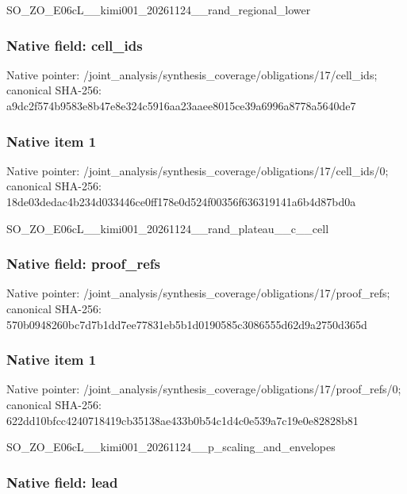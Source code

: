 \documentclass[10pt,a4paper]{article}
\begin{document}
SO\_ZO\_E06cL\_\_kimi001\_202\allowbreak{}61124\_\_rand\_regional\_low\allowbreak{}er


\subsubsection{Native field: cell\_ids}


Native pointer: /joint\_analysis/synthesi\allowbreak{}s\_coverage/obligations/1\allowbreak{}7/cell\_ids; canonical SHA-256: a9dc2f574b9583e8b47e8e32\allowbreak{}4c5916aa23aaee8015ce39a6\allowbreak{}996a8778a5640de7



\subsubsection{Native item 1}


Native pointer: /joint\_analysis/synthesi\allowbreak{}s\_coverage/obligations/1\allowbreak{}7/cell\_ids/0; canonical SHA-256: 18de03dedac4b234d033446c\allowbreak{}e0ff178e0d524f00356f6363\allowbreak{}19141a6b4d87bd0a


SO\_ZO\_E06cL\_\_kimi001\_202\allowbreak{}61124\_\_rand\_plateau\_\_c\_\_\allowbreak{}cell


\subsubsection{Native field: proof\_refs}


Native pointer: /joint\_analysis/synthesi\allowbreak{}s\_coverage/obligations/1\allowbreak{}7/proof\_refs; canonical SHA-256: 570b0948260bc7d7b1dd7ee7\allowbreak{}7831eb5b1d0190585c308655\allowbreak{}5d62d9a2750d365d



\subsubsection{Native item 1}


Native pointer: /joint\_analysis/synthesi\allowbreak{}s\_coverage/obligations/1\allowbreak{}7/proof\_refs/0; canonical SHA-256: 622dd10bfcc4240718419cb3\allowbreak{}5138ae433b0b54c1d4c0e539\allowbreak{}a7c19e0e82828b81


SO\_ZO\_E06cL\_\_kimi001\_202\allowbreak{}61124\_\_p\_scaling\_and\_env\allowbreak{}elopes


\subsubsection{Native field: lead}
\end{document}
